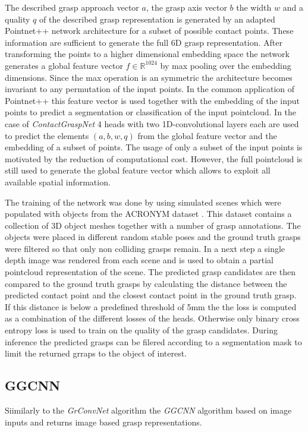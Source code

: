 The described grasp approach vector $a$, the grasp axis vector $b$ the width $w$ and a quality $q$ of the described grasp representation is generated by an adapted
Pointnet++ network architecture for a subset of possible contact points.
These information are sufficient to generate the full 6D grasp representation.
After transforming the points to a higher dimensional embedding space the network generates a global feature vector $f \in \mathbb{R}^1024$ by max pooling over the embedding dimensions.
Since the max operation is an symmetric the architecture becomes invariant to any permutation of the input points.
In the common application of Pointnet++ this feature vector is used together with the embedding of the input points to predict a segmentation or classification of the input pointcloud.
In the case of \textit{ContactGraspNet} 4 heads with two 1D-convolutional layers each are used to predict the elements $(a, b, w, q)$ from the global feature vector
and the embedding of a subset of points.
The usage of only a subset of the input points is motivated by the reduction of computational cost.
However, the full pointcloud is still used to generate the global feature vector which allows to exploit all available spatial information.

The training of the network was done by using simulated scenes which were populated with objects from the ACRONYM dataset \cite{}.
This dataset contains a collection of 3D object meshes together with a number of grasp annotations.
The objects were placed in different random stable poses and the ground truth grasps were filtered so that only non colliding grasps remain.
In a next step a single depth image was rendered from each scene and is used to obtain a partial pointcloud representation of the scene.
The predicted grasp candidates are then compared to the ground truth grasps by calculating the distance between the predicted contact point and
the closest contact point in the ground truth grasp.
If this distance is below a predefined threshold of 5mm the the loss is computed as a combination of the different losses of the heads.
Otherwise only binary cross entropy loss is used to train on the quality of the grasp candidates.
During inference the predicted grasps can be filered according to a segmentation mask to limit the returned grraps to the object of interest.


\subsection{GGCNN}
Siimilarly to the \textit{GrConvNet} algorithm the \textit{GGCNN} algorithm based on image inputs and returns image based grasp representations.
